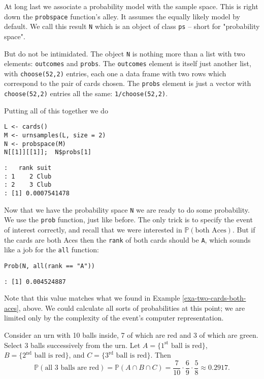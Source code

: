 At long last we associate a probability model with the sample
space. This is right down the \texttt{probspace} function's alley. It assumes
the equally likely model by default. We call this result \texttt{N} which is
an object of class \texttt{ps} -- short for "probability space".

But do not be intimidated. The object \texttt{N} is nothing more than a list
with two elements: \texttt{outcomes} and \texttt{probs}. The \texttt{outcomes} element is
itself just another list, with \texttt{choose(52,2)} entries, each one a data
frame with two rows which correspond to the pair of cards chosen. The
\texttt{probs} element is just a vector with \texttt{choose(52,2)} entries all the
same: \texttt{1/choose(52,2)}.

Putting all of this together we do 

\begin{verbatim}
L <- cards()
M <- urnsamples(L, size = 2)
N <- probspace(M)
N[[1]][[1]];  N$probs[1]
\end{verbatim}

\begin{verbatim}
:   rank suit
: 1    2 Club
: 2    3 Club
: [1] 0.0007541478
\end{verbatim}

Now that we have the probability space \texttt{N} we are ready to do some
probability. We use the \texttt{prob} function, just like before. The only
trick is to specify the event of interest correctly, and recall that
we were interested in \(\mathbb{P}(\mbox{both Aces})\). But if the
cards are both Aces then the \texttt{rank} of both cards should be \texttt{A}, which
sounds like a job for the \texttt{all} function:

\begin{verbatim}
Prob(N, all(rank == "A"))
\end{verbatim}

\begin{verbatim}
: [1] 0.004524887
\end{verbatim}

Note that this value matches what we found in Example
\ref{exa-two-cards-both-aces}, above. We could calculate all sorts of
probabilities at this point; we are limited only by the complexity of
the event's computer representation.


\label{exa-urn-7-red-3-green} Consider an urn with 10 balls inside, 7 of
which are red and 3 of which are green. Select 3 balls successively
from the urn. Let \( A = \{ 1^{\mathrm{st}} \mbox{ ball is red} \} \),
\( B = \{ 2^{\mathrm{nd}} \mbox{ ball is red} \} \), and \( C = \{
3^{\mathrm{rd}} \mbox{ ball is red} \} \). Then \[
\mathbb{P}(\mbox{all 3 balls are red})=\mathbb{P}(A\cap B\cap
C)=\frac{7}{10}\cdot\frac{6}{9}\cdot\frac{5}{8}\approx 0.2917.  \]


